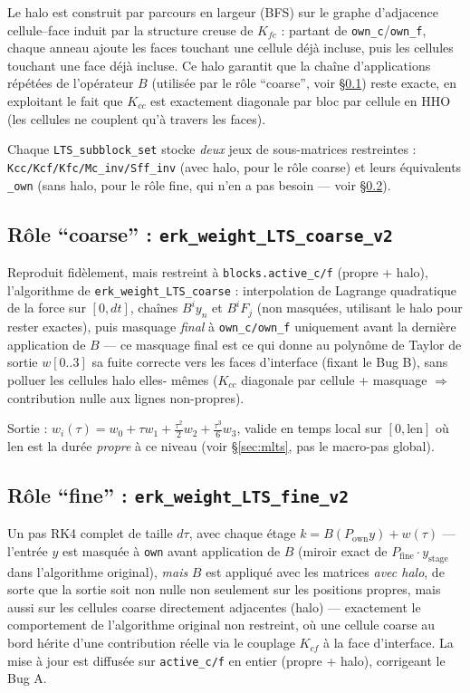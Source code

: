 \documentclass[11pt]{article}
\newcommand{\code}[1]{\texttt{#1}}
\begin{document}
Le halo est construit par parcours en largeur (BFS) sur le graphe
d'adjacence cellule--face induit par la structure creuse de $K_{fc}$ :
partant de \code{own\_c}/\code{own\_f}, chaque anneau ajoute les faces
touchant une cellule déjà incluse, puis les cellules touchant une face déjà
incluse. Ce halo garantit que la chaîne d'applications répétées de
l'opérateur $B$ (utilisée par le rôle ``coarse'', voir \S\ref{sec:coarse})
reste exacte, en exploitant le fait que $K_{cc}$ est exactement
diagonale par bloc par cellule en HHO (les cellules ne couplent qu'à
travers les faces).

Chaque \code{LTS\_subblock\_set} stocke \emph{deux} jeux de sous-matrices
restreintes : \code{Kcc/Kcf/Kfc/Mc\_inv/Sff\_inv} (avec halo, pour le rôle
coarse) et leurs équivalents \code{\_own} (sans halo, pour le rôle fine, qui
n'en a pas besoin --- voir \S\ref{sec:fine}).

\subsection{Rôle ``coarse'' : \code{erk\_weight\_LTS\_coarse\_v2}}
\label{sec:coarse}

Reproduit fidèlement, mais restreint à \code{blocks.active\_c/f}
(propre + halo), l'algorithme de \code{erk\_weight\_LTS\_coarse} :
interpolation de Lagrange quadratique de la force sur $[0,dt]$, chaînes
$B^i y_n$ et $B^i F_j$ (non masquées, utilisant le halo pour rester
exactes), puis masquage \emph{final} à \code{own\_c/own\_f} uniquement
avant la dernière application de $B$ --- ce masquage final est ce qui
donne au polynôme de Taylor de sortie $w[0..3]$ sa fuite correcte vers les
faces d'interface (fixant le Bug B), sans polluer les cellules halo elles-
mêmes ($K_{cc}$ diagonale par cellule + masquage $\Rightarrow$ contribution
nulle aux lignes non-propres).

Sortie : $w_i(\tau) = w_0 + \tau w_1 + \tfrac{\tau^2}{2} w_2 +
\tfrac{\tau^3}{6} w_3$, valide en temps local sur $[0, \mathrm{len}]$ où
$\mathrm{len}$ est la durée \emph{propre} à ce niveau (voir
\S\ref{sec:mlts}, pas le macro-pas global).

\subsection{Rôle ``fine'' : \code{erk\_weight\_LTS\_fine\_v2}}
\label{sec:fine}

Un pas RK4 complet de taille $d\tau$, avec chaque étage
$k = B(P_{\text{own}} y) + w(\tau)$ --- l'entrée $y$ est masquée à
\code{own} avant application de $B$ (miroir exact de $P_{\text{fine}} \cdot
y_{\text{stage}}$ dans l'algorithme original), \emph{mais} $B$ est
appliqué avec les matrices \emph{avec halo}, de sorte que la sortie soit
non nulle non seulement sur les positions propres, mais aussi sur les
cellules coarse directement adjacentes (halo) --- exactement le
comportement de l'algorithme original non restreint, où une cellule
coarse au bord hérite d'une contribution réelle via le couplage $K_{cf}$
à la face d'interface. La mise à jour est diffusée sur \code{active\_c/f}
en entier (propre + halo), corrigeant le Bug A.
\end{document}

